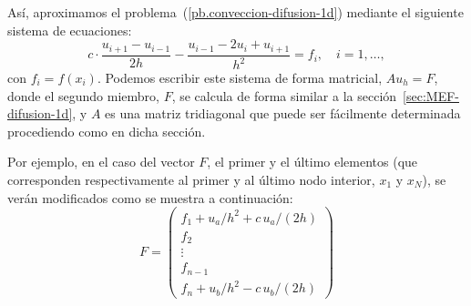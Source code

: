 \documentclass[11pt,spanish,a4wide]{article}
\begin{document}
Así, aproximamos el problema~(\ref{pb.conveccion-difusion-1d})
mediante el siguiente sistema de ecuaciones:
$$
c\cdot \frac{u_{i+1}-u_{i-1}}{2h} -\frac{u_{i-1}-2u_i + u_{i+1}}{h^2}
= f_i, \quad i=1,\dots,
$$
con $f_i=f(x_i)$. Podemos escribir este sistema de forma matricial,
$A u_h = F$, donde el segundo miembro, $F$, se calcula de forma similar a
la sección~\ref{sec:MEF-difusion-1d}, y $A$ es una matriz tridiagonal
que puede ser fácilmente determinada procediendo como en dicha
sección.

Por ejemplo, en el caso del vector $F$, el primer y el último
elementos (que corresponden respectivamente al primer y al último nodo
interior, $x_1$ y $x_N$), se verán modificados como se muestra a continuación:
$$
F=
\begin{pmatrix}
  f_1 + u_a/h^2 + c\, u_a/(2h)
  \\ f_2 \\ \vdots \\ f_{n-1} \\[1mm]
  f_n+u_b/h^2 - c\, u_b/(2h)
\end{pmatrix}
$$
\end{document}
